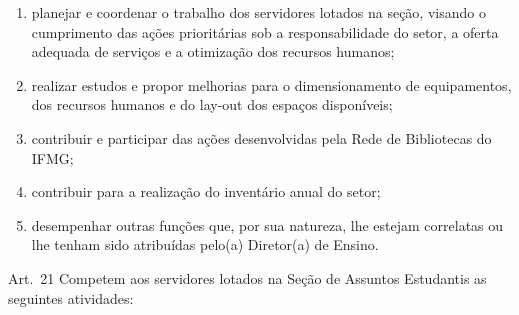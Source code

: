 \documentclass[a4paper,12pt]{report}
\begin{document}
\begin{enumerate}
\renewcommand{\labelenumi}{\Roman{enumi}}

\item planejar e coordenar o trabalho dos servidores lotados na seção, visando o 
      cumprimento das ações prioritárias sob a responsabilidade do setor, a oferta adequada de serviços e a otimização dos recursos humanos;

\item realizar estudos e propor melhorias para o dimensionamento de equipamentos, dos 
      recursos humanos e do lay-out dos espaços disponíveis;

\item contribuir e participar das ações desenvolvidas pela Rede de Bibliotecas do IFMG; 

\item contribuir para a realização do inventário anual do setor;

\item desempenhar outras funções que, por sua natureza, lhe estejam correlatas ou lhe 
      tenham sido atribuídas pelo(a) Diretor(a) de Ensino.
\end{enumerate}


Art.~21 Competem aos servidores lotados na Seção de Assuntos Estudantis as seguintes atividades:
\end{document}
